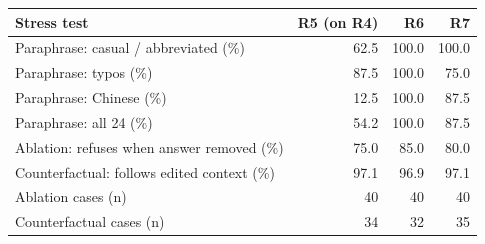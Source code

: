 \begin{tabular}{lrrr}
\toprule
Stress test & R5 (on R4) & R6 & R7 \\
\midrule
Paraphrase: casual / abbreviated (\%) & 62.5 & 100.0 & 100.0 \\
Paraphrase: typos (\%) & 87.5 & 100.0 & 75.0 \\
Paraphrase: Chinese (\%) & 12.5 & 100.0 & 87.5 \\
Paraphrase: all 24 (\%) & 54.2 & 100.0 & 87.5 \\
Ablation: refuses when answer removed (\%) & 75.0 & 85.0 & 80.0 \\
Counterfactual: follows edited context (\%) & 97.1 & 96.9 & 97.1 \\
Ablation cases (n) & 40 & 40 & 40 \\
Counterfactual cases (n) & 34 & 32 & 35 \\
\bottomrule
\end{tabular}
